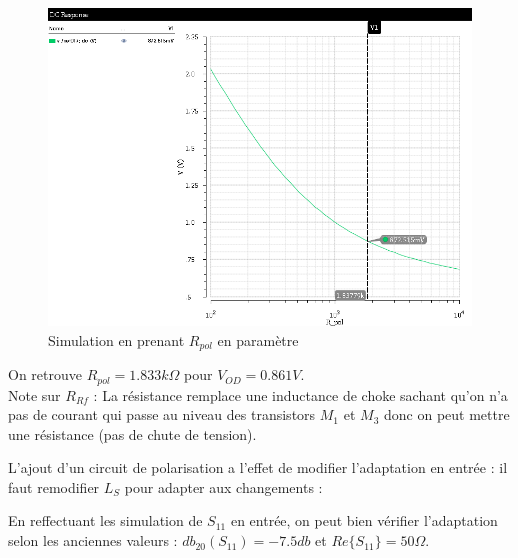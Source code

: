 \documentclass[a4paper]{article}
\begin{document}
\begin{figure}[!htb]
\begin{center}
  \includegraphics[scale=0.45]{Q3-Rpol-sweep.png}
  \caption{Simulation en prenant $R_{pol}$ en param\`etre}
  \label{schema-pol}
\end{center}
\end{figure}

On retrouve $R_{pol} = 1.833 k\Omega$ pour $V_{OD} = 0.861V$.\\
Note sur $R_{Rf}$ : La r\'esistance remplace une inductance de choke sachant qu'on n'a pas
de courant qui passe au niveau des transistors $M_1$ et $M_3$ donc on peut mettre une r\'esistance
(pas de chute de tension).

\clearpage
L'ajout d'un circuit de polarisation a l'effet de modifier l'adaptation en entr\'ee :
il faut remodifier $L_S$ pour adapter aux changements :

En reffectuant les simulation de $S_{11}$ en entr\'ee, on peut bien v\'erifier l'adaptation
selon les anciennes valeurs : $db_{20}(S_{11}) = -7.5 db$ et $Re\{S_{11}\} = 50 \Omega$.
\end{document}
